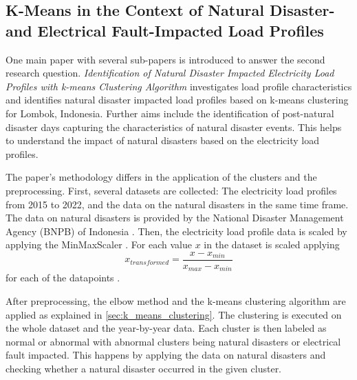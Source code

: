 \subsection{K-Means in the Context of Natural Disaster- and Electrical Fault-Impacted Load Profiles}
One main paper with several sub-papers is introduced to answer the second research question.
\textit{Identification of Natural Disaster Impacted Electricity Load Profiles with k-means Clustering Algorithm} \cite{JES-IND} investigates load profile characteristics and identifies natural disaster impacted load profiles based on k-means clustering for Lombok, Indonesia.
Further aims include the identification of post-natural disaster days capturing the characteristics of natural disaster events.
This helps to understand the impact of natural disasters based on the electricity load profiles.

The paper's methodology differs in the application of the clusters and the preprocessing.
First, several datasets are collected: The electricity load profiles from 2015 to 2022, and the data on the natural disasters in the same time frame.
The data on natural disasters is provided by the National Disaster Management Agency (BNPB) of Indonesia \cite{BNP-CAD}.
Then, the electricity load profile data is scaled by applying the MinMaxScaler \cite{SKL-MMS}.
For each value $x$ in the dataset is scaled applying \begin{equation}\label{eq:minmaxscaler} 
      x_{transformed} = \frac{x - x_{min}}{x_{max} - x_{min}}
\end{equation} for each of the datapoints \cite{JOJ-ENP}.

After preprocessing, the elbow method and the k-means clustering algorithm are applied as explained in \autoref{sec:k_means_clustering}.
The clustering is executed on the whole dataset and the year-by-year data.
Each cluster is then labeled as normal or abnormal with abnormal clusters being natural disasters or electrical fault impacted.
This happens by applying the data on natural disasters and checking whether a natural disaster occurred in the given cluster.



